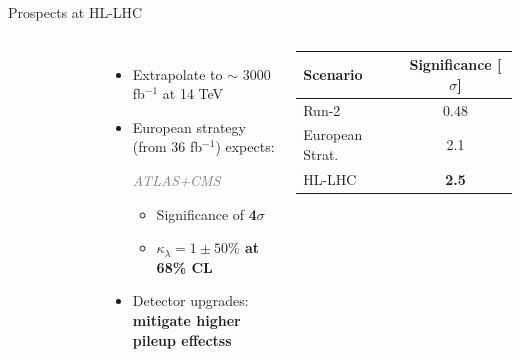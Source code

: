 \begin{frame}{Prospects at HL-LHC}

\begin{columns}

\begin{figure}
  \centering
\end{figure}


\begin{itemize}
    \item Extrapolate to $\sim$ 3000 fb$^{-1}$ at 14 TeV
    \item European strategy (from 36 fb$^{-1}$) expects: 
    \begin{center}
       \textit{ \textcolor{gray}{ATLAS+CMS}}
    \end{center}
    \begin{itemize}
        \item Significance of \textbf{\textcolor{HHred}{4$\sigma$}}
        \item \textbf{$\kappa_{\lambda} = 1 \pm 50\%$ at 68\% CL}
    \end{itemize}
    \item Detector upgrades: \textbf{mitigate higher pileup effectss} 
\end{itemize}

\begin{table}[]
    \centering
    \begin{tabular}{lc}
        \hline\hline
        Scenario & Significance [$\sigma$]  \\
        \hline
        Run-2 & 0.48 \\
        European Strat. & 2.1 \\
        HL-LHC & \textcolor{HHturquoise_d}{\textbf{2.5}} \\
        \hline\hline
    \end{tabular}
\end{table}
\end{columns}  
\end{frame}